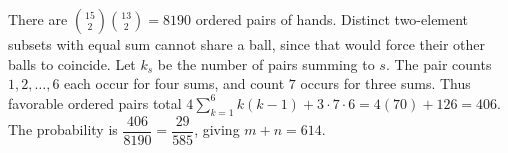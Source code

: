 There are $\binom{15}{2}\binom{13}{2}=8190$ ordered pairs of hands. Distinct two-element subsets with equal sum cannot share a ball, since that would force their other balls to coincide. Let $k_s$ be the number of pairs summing to $s$. The pair counts $1,2,\ldots,6$ each occur for four sums, and count $7$ occurs for three sums. Thus favorable ordered pairs total $4\sum_{k=1}^6k(k-1)+3\cdot7\cdot6=4(70)+126=406$. The probability is $\dfrac{406}{8190}=\dfrac{29}{585}$, giving $m+n=\boxed{614}$.
